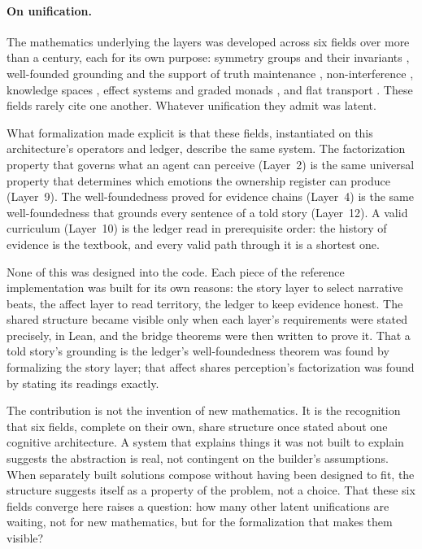 \documentclass[11pt]{article}
\theoremstyle{remark}
\begin{document}
\paragraph{On unification.}

The mathematics underlying the layers was developed across six fields over more than a
century, each for its own purpose: symmetry groups and their invariants \citep{Klein1893},
well-founded grounding \citep{Kripke1975} and the support of truth maintenance
\citep{Doyle1979}, non-interference \citep{GoguenMeseguer1982}, knowledge spaces
\citep{DoignonFalmagne1985}, effect systems and graded monads
\citep{LucassenGifford1988,Katsumata2014}, and flat transport \citep{Giraud1971}. These fields
rarely cite one another. Whatever unification they admit was latent.

What formalization made explicit is that these fields, instantiated on this architecture's
operators and ledger, describe the same system. The factorization property that governs
what an agent can perceive (Layer~2) is the same universal property that determines which
emotions the ownership register can produce (Layer~9). The well-foundedness proved for
evidence chains (Layer~4) is the same well-foundedness that grounds every sentence of a told
story (Layer~12). A valid curriculum (Layer~10) is the ledger read in prerequisite order:
the history of evidence is the textbook, and every valid path through it is a shortest one.

None of this was designed into the code. Each piece of the reference implementation was
built for its own reasons: the story layer to select narrative beats, the affect layer to
read territory, the ledger to keep evidence honest. The shared structure became visible
only when each layer's requirements were stated precisely, in Lean, and the bridge theorems
were then written to prove it. That a told story's grounding is the ledger's
well-foundedness theorem was found by formalizing the story layer; that affect shares
perception's factorization was found by stating its readings exactly.

The contribution is not the invention of new mathematics. It is the recognition that six
fields, complete on their own, share structure once stated about one cognitive
architecture. A system that explains things it was not built to explain suggests the
abstraction is real, not contingent on the builder's assumptions. When separately built
solutions compose without having been designed to fit, the structure suggests itself as a
property of the problem, not a choice. That these six fields converge here raises a
question: how many other latent unifications are waiting, not for new mathematics, but for
the formalization that makes them visible?
\end{document}
